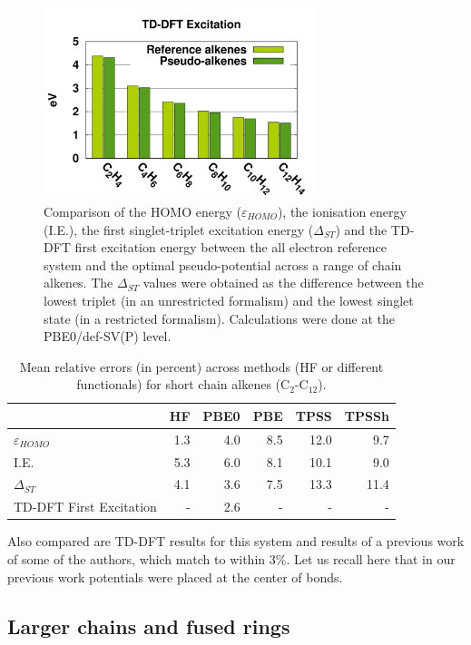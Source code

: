 \documentclass[aip]{revtex4-1}
\begin{document}
\begin{figure}
\begin{center}
\includegraphics[width=8cm]{short_pbe0_tddft}
\end{center}
\caption{Comparison of the HOMO energy ($\varepsilon_{HOMO}$),
the ionisation energy (I.E.),
the first singlet-triplet excitation energy ($\Delta_{ST}$) and
the TD-DFT first excitation energy
between the
all electron reference system and the optimal pseudo-potential across a range of chain alkenes.
The $\Delta_{ST}$ values were obtained as the difference
between the lowest triplet (in an unrestricted formalism) and the lowest singlet state
(in a restricted formalism).
Calculations were done at the PBE0/def-SV(P) level.}
\label{fig:alkenes_hf_dft}
\end{figure}

\begin{table}[ht]
\begin{tabular}{l r r r r r }
\hline \hline
                        & HF & PBE0 & PBE & TPSS & TPSSh \\
\hline
$\varepsilon_{HOMO}$    & 1.3 & 4.0 & 8.5 & 12.0 &  9.7 \\
I.E.                    & 5.3 & 6.0 & 8.1 & 10.1 &  9.0 \\
$\Delta_{ST}$           & 4.1 & 3.6 & 7.5 & 13.3 & 11.4 \\
TD-DFT First Excitation &   - & 2.6 &   - &    - &    - \\ 
\hline\hline
\end{tabular}
\caption{Mean relative errors (in percent) across methods (HF or different functionals)
for short chain alkenes  (C\(_{2}\)-C\(_{12}\)).}
\label{table:alkene_errors}
\end{table}

Also compared are TD-DFT results for this system and results of a previous work of some of the authors, which match to within 3\%.\cite{drujon_pseudopotentials_2013}
Let us recall here that in our previous work potentials were placed at the center of bonds.

\subsection{Larger chains and fused rings}
\end{document}

